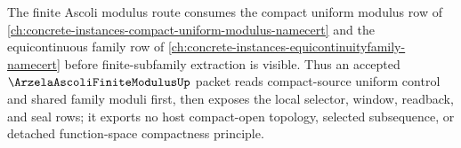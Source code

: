 The finite Ascoli modulus route consumes the compact uniform modulus row of \autoref{ch:concrete-instances-compact-uniform-modulus-namecert} and the equicontinuous family row of \autoref{ch:concrete-instances-equicontinuityfamily-namecert} before finite-subfamily extraction is visible. Thus an accepted $\ArzelaAscoliFiniteModulusUp$ packet reads compact-source uniform control and shared family moduli first, then exposes the local selector, window, readback, and seal rows; it exports no host compact-open topology, selected subsequence, or detached function-space compactness principle.
